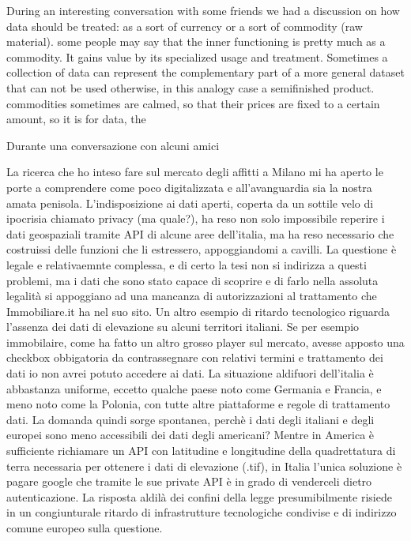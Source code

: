 \documentclass[
  12pt,
  a4paper,
  oneside]{book}
\begin{document}
During an interesting conversation with some friends we had a discussion on how data should be treated: as a sort of currency or a sort of commodity (raw material).
some people may say that the inner functioning is pretty much as a commodity. It gains value by its specialized usage and treatment. Sometimes a collection of data can represent the complementary part of a more general dataset that can not be used otherwise, in this analogy case a semifinished product. commodities sometimes are calmed, so that their prices are fixed to a certain amount, so it is for data, the

Durante una conversazione con alcuni amici

La ricerca che ho inteso fare sul mercato degli affitti a Milano mi ha aperto le porte a comprendere come poco digitalizzata e all'avanguardia sia la nostra amata penisola. L'indisposizione ai dati aperti, coperta da un sottile velo di ipocrisia chiamato privacy (ma quale?), ha reso non solo impossibile reperire i dati geospaziali tramite API di alcune aree dell'italia, ma ha reso necessario che costruissi delle funzioni che li estressero, appoggiandomi a cavilli. La questione è legale e relativaemnte complessa, e di certo la tesi non si indirizza a questi problemi, ma i dati che sono stato capace di scoprire e di farlo nella assoluta legalità si appoggiano ad una mancanza di autorizzazioni al trattamento che Immobiliare.it ha nel suo sito.
Un altro esempio di ritardo tecnologico riguarda l'assenza dei dati di elevazione su alcuni territori italiani.
Se per esempio immobilaire, come ha fatto un altro grosso player sul mercato, avesse apposto una checkbox obbigatoria da contrassegnare con relativi termini e trattamento dei dati io non avrei potuto accedere ai dati. La situazione aldifuori dell'italia è abbastanza uniforme, eccetto qualche paese noto come Germania e Francia, e meno noto come la Polonia, con tutte altre piattaforme e regole di trattamento dati. La domanda quindi sorge spontanea, perchè i dati degli italiani e degli europei sono meno accessibili dei dati degli americani?
Mentre in America è sufficiente richiamare un API con latitudine e longitudine della quadrettatura di terra necessaria per ottenere i dati di elevazione (.tif), in Italia l'unica soluzione è pagare google che tramite le sue private API è in grado di venderceli dietro autenticazione.
La risposta aldilà dei confini della legge presumibilmente risiede in un congiunturale ritardo di infrastrutture tecnologiche condivise e di indirizzo comune europeo sulla questione.
\end{document}
